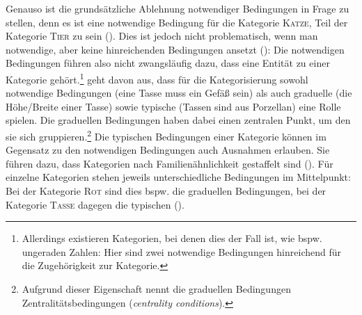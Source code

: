 Genauso ist die grundsätzliche Ablehnung notwendiger Bedingungen in Frage zu stellen, denn es ist eine notwendige Bedingung für die Kategorie \textsc{Katze}, Teil der Kategorie \textsc{Tier} zu sein (\cite[89--91]{Kleiber.1993}). Dies ist jedoch nicht problematisch, wenn man notwendige, aber keine hinreichenden Bedingungen ansetzt (\cite[90--91]{Kleiber.1993}): Die notwendigen Bedingungen führen also nicht zwangsläufig dazu, dass eine Entität zu einer Kategorie gehört.\footnote{Allerdings existieren Kategorien, bei denen dies der Fall ist, wie bspw. ungeraden Zahlen: Hier sind zwei notwendige Bedingungen hinreichend für die Zugehörigkeit zur Kategorie.} \textcite[128]{Jackendoff.2004} geht davon aus, dass für die Kategorisierung sowohl notwendige Bedingungen (eine Tasse muss ein Gefäß sein) als auch graduelle (die Höhe/Breite einer Tasse) sowie typische (Tassen sind aus Porzellan) eine Rolle spielen. Die graduellen Bedingungen haben dabei einen zentralen Punkt, um den sie sich gruppieren.\footnote{Aufgrund dieser Eigenschaft nennt \textcite[128]{Jackendoff.2004} die graduellen Bedingungen Zentralitätsbedingungen (\textit{centrality conditions}).} Die typischen Bedingungen einer Kategorie können im Gegensatz zu den notwendigen Bedingungen auch Ausnahmen erlauben. Sie führen dazu, dass Kategorien nach Familienähnlichkeit gestaffelt sind (\cite[128]{Jackendoff.2004}). Für einzelne Kategorien stehen jeweils unterschiedliche Bedingungen im Mittelpunkt: Bei der Kategorie \textsc{Rot} sind dies bspw. die graduellen Be\-dingungen, bei der Kategorie \textsc{Tasse} dagegen die typischen (\cite[128]{Jackendoff.2004}).\largerpage

